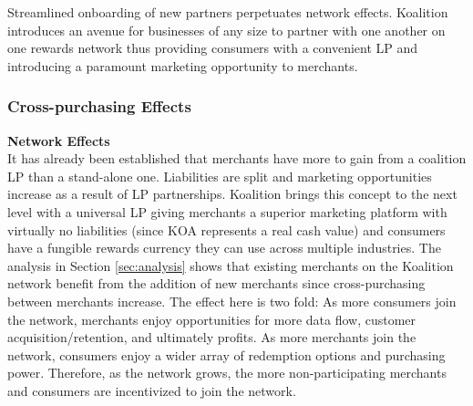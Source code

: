 Streamlined onboarding of new partners perpetuates network effects. Koalition introduces an avenue for businesses of any size to partner with one another on one rewards network thus providing consumers with a convenient LP and introducing a paramount marketing opportunity to merchants. 

\subsubsection{Cross-purchasing Effects}

\textbf{Network Effects} \\
It has already been established that merchants have more to gain from a coalition LP than a stand-alone one. Liabilities are split and marketing opportunities increase as a result of LP partnerships. Koalition brings this concept to the next level with a universal LP giving merchants a superior marketing platform with virtually no liabilities (since KOA represents a real cash value) and consumers have a fungible rewards currency they can use across multiple industries. The analysis in Section \ref{sec:analysis} shows that existing merchants on the Koalition network benefit from the addition of new merchants since cross-purchasing between merchants increase. The effect here is two fold: As more consumers join the network, merchants enjoy opportunities for more data flow, customer acquisition/retention, and ultimately profits. As more merchants join the network, consumers enjoy a wider array of redemption options and purchasing power. Therefore, as the network grows, the more non-participating merchants and consumers are incentivized to join the network. 

